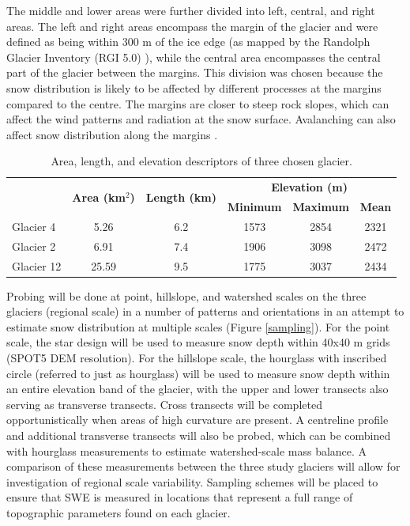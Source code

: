 \documentclass[12pt]{article}
\begin{document}
The middle and lower areas were further divided into left, central, and right areas. The left and right areas encompass the margin of the glacier and were defined as being within 300 m of the ice edge (as mapped by the Randolph Glacier Inventory (RGI 5.0) \citep{Pfeffer2014}), while the central area encompasses the central part of the glacier between the margins. This division was chosen because the snow distribution is likely to be affected by different processes at the margins compared to the centre. The margins are closer to steep rock slopes, which can affect the wind patterns and radiation at the snow surface. Avalanching can also affect snow distribution along the margins \citep{Bloschl1991}. 

\begin{table}[t!]
\centering
\caption{Area, length, and elevation descriptors of three chosen glacier.}
\label{glacierstats}
\begin{tabular}{|l|c|c|ccc|}
\hline
\multicolumn{1}{|c|}{} & \multirow{2}{*}{\textbf{Area (km$^2$)}} & \multirow{2}{*}{\textbf{Length (km)}} & \multicolumn{3}{c|}{\textbf{Elevation (m)}}         \\
\multicolumn{1}{|c|}{} &                                         &                                       & \textbf{Minimum} & \textbf{Maximum} & \textbf{Mean} \\ \hline
Glacier 4              & 5.26                                    & 6.2                                   & 1573             & 2854             & 2321          \\
Glacier 2              & 6.91                                    & 7.4                                   & 1906             & 3098             & 2472          \\
Glacier 12             & 25.59                                   & 9.5                                   & 1775             & 3037             & 2434          \\ \hline
\end{tabular}
\end{table} 

Probing will be done at point, hillslope, and watershed scales on the three glaciers (regional scale) in a number of patterns and orientations in an attempt to estimate snow distribution at multiple scales (Figure \ref{sampling}). For the point scale, the star design will be used to measure snow depth within 40x40 m grids (SPOT5 DEM resolution). For the hillslope scale, the hourglass with inscribed circle (referred to just as hourglass) will be used to measure snow depth within an entire elevation band of the glacier, with the upper and lower transects also serving as transverse transects. Cross transects will be completed opportunistically when areas of high curvature are present. A centreline profile and additional transverse transects will also be probed, which can be combined with hourglass measurements to estimate watershed-scale mass balance. A comparison of these measurements between the three study glaciers will allow for investigation of regional scale variability. Sampling schemes will be placed to ensure that SWE is measured in locations that represent a full range of topographic parameters found on each glacier. 
\end{document}
